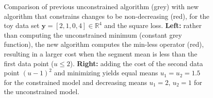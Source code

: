 \documentclass{article}
\newtheorem{definition}{Definition}
\newcommand{\RR}{\mathbb R}
\begin{document}
\begin{figure}
  \centering
  
  
  \vskip -0.5cm
  \caption{Comparison of previous unconstrained algorithm (grey) with
    new algorithm that constrains changes to be non-decreasing (red),
    for the toy data set $\mathbf y= [ 2, 1, 0, 4 ] \in\RR^4$ and the
    square loss. \textbf{Left:} rather than computing the
    unconstrained minimum (constant grey function), the new algorithm
    computes the min-less operator (red), resulting in a larger cost
    when the segment mean is less than the first data point
    ($u\leq 2$). \textbf{Right:} adding the cost of the second data
    point $(u-1)^2$ and minimizing yields equal means
    $u_1=u_2=1.5$ for the constrained model and decreasing 
    means $u_1=2,\, u_2=1$ for the unconstrained model.}
  \label{fig:compare-unconstrained}
\end{figure}

\end{document}
